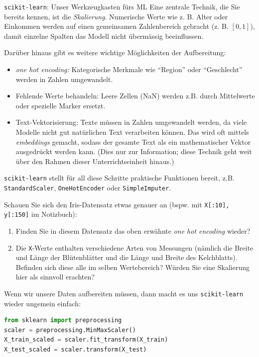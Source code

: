 \begin{lpu}{\texttt{scikit-learn}: Unser Werkzeugkasten fürs ML}
Eine zentrale Technik, die Sie bereits kennen, ist die \textit{Skalierung}. Numerische Werte wie z. B. Alter oder Einkommen werden auf einen gemeinsamen Zahlenbereich gebracht (z. B. $[0,1]$), damit einzelne Spalten das Modell nicht übermässig beeinflussen.

Darüber hinaus gibt es weitere wichtige Möglichkeiten der Aufbereitung:

\begin{itemize}
  \item \textit{one hot encoding:} Kategorische Merkmale wie ``Region'' oder ``Geschlecht'' werden in Zahlen umgewandelt.
  \item Fehlende Werte behandeln: Leere Zellen (NaN) werden z.B. durch Mittelwerte oder spezielle Marker ersetzt.
  \item Text-Vektorisierung: Texte müssen in Zahlen umgewandelt werden, da viele Modelle nicht gut natürlichen Text verarbeiten können. Das wird oft mittels \textit{embeddings} gemacht, sodass der gesamte Text als ein mathematischer Vektor ausgedrückt werden kann. (Dies nur zur Information; diese Technik geht weit über den Rahmen dieser Unterrichtseinheit hinaus.)
\end{itemize}

\texttt{scikit-learn} stellt für all diese Schritte praktische Funktionen bereit, z.B. \texttt{StandardScaler}, \texttt{OneHotEncoder} oder \texttt{SimpleImputer}.

\begin{aufgabe}{2}
Schauen Sie sich den Iris-Datensatz etwas genauer an (bspw. mit \texttt{X[:10], y[:150]} im Notizbuch):

\begin{enumerate}
    \item Finden Sie in diesem Datensatz das oben erwähnte \textit{one hot encoding} wieder?
    \item Die \texttt{X}-Werte enthalten verschiedene Arten von Messungen (nämlich die Breite und Länge der Blütenblätter und die Länge und Breite des Kelchblatts). Befinden sich diese alle im selben Wertebereich? Würden Sie eine Skalierung hier als sinnvoll erachten?
\end{enumerate}
\end{aufgabe}

Wenn wir unsere Daten aufbereiten müssen, dann macht es uns \texttt{scikit-learn} wieder ungemein einfach:
\begin{lstlisting}[language=Python]
from sklearn import preprocessing
scaler = preprocessing.MinMaxScaler()
X_train_scaled = scaler.fit_transform(X_train)
X_test_scaled = scaler.transform(X_test)
\end{lstlisting}


\end{lpu}
